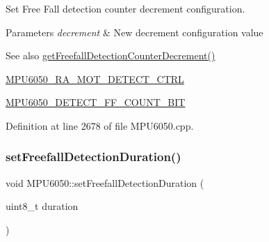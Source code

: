 Set Free Fall detection counter decrement configuration. 
\begin{DoxyParams}{Parameters}
{\em decrement} & New decrement configuration value \\
\hline
\end{DoxyParams}
\begin{DoxySeeAlso}{See also}
\mbox{\hyperlink{classMPU6050_af6d6fa9869636989a8b29c4827ad7de8}{get\+Freefall\+Detection\+Counter\+Decrement()}} 

\mbox{\hyperlink{MPU6050_8h_ae83e3eb48f0803227db54291fdf0ea80}{M\+P\+U6050\+\_\+\+R\+A\+\_\+\+M\+O\+T\+\_\+\+D\+E\+T\+E\+C\+T\+\_\+\+C\+T\+RL}} 

\mbox{\hyperlink{MPU6050_8h_a77e346aef05647d9d492077e0297d67b}{M\+P\+U6050\+\_\+\+D\+E\+T\+E\+C\+T\+\_\+\+F\+F\+\_\+\+C\+O\+U\+N\+T\+\_\+\+B\+IT}} 
\end{DoxySeeAlso}


Definition at line 2678 of file M\+P\+U6050.\+cpp.


\begin{DoxyCode}{0}

\end{DoxyCode}
\mbox{\label{classMPU6050_a41eeb40a654465966d260e3d31c4de4b}} 
\subsubsection{\texorpdfstring{setFreefallDetectionDuration()}{setFreefallDetectionDuration()}}
{\footnotesize\ttfamily void M\+P\+U6050\+::set\+Freefall\+Detection\+Duration (\begin{DoxyParamCaption}\item[{uint8\+\_\+t}]{duration }\end{DoxyParamCaption})}

